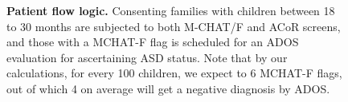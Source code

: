 \documentclass[onecolumn, compsoc,11pt]{IEEEtran}
\renewcommand{\captionN}[1]{\caption{\color{CadetBlue4!80!black} \sffamily \fontsize{9}{10}\selectfont #1  }}
\def\ZERO{ACoR\xspace}
\begin{document}
\begin{figure}[t]
\begin{center}
\tikzexternaldisable
{}
\end{center}
\vspace{-10pt}

\captionN{\textbf{Patient flow logic.} Consenting families with children between 18 to 30 months are subjected to both M-CHAT/F and \ZERO screens, and those with a MCHAT-F flag is scheduled for an ADOS evaluation for ascertaining ASD status. Note that by our calculations, for every 100 children, we expect to 6 MCHAT-F flags, out of which 4 on average will get a negative diagnosis by ADOS.}\label{figflow}
\end{figure}



\end{document}
